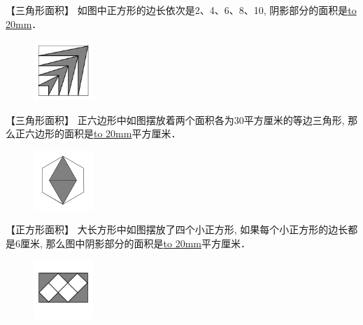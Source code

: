 \item {
    【三角形面积】
    如图中正方形的边长依次是2、4、6、8、10, 阴影部分的面积是\underline{\hbox to 20mm{}}．
    \begin{figure}[H] 
        \centering
        \includegraphics[width=0.2\textwidth]{./pics/Chapter_2/17.png}
    \end{figure}
    \vspace{1cm}
}

\item {
    【三角形面积】
    正六边形中如图摆放着两个面积各为30平方厘米的等边三角形, 那么正六边形的面积是\underline{\hbox to 20mm{}}平方厘米．
    \begin{figure}[H] 
        \centering
        \includegraphics[width=0.2\textwidth]{./pics/Chapter_2/18.png}
    \end{figure}
    \vspace{1cm}
}

\item {
    【正方形面积】
    大长方形中如图摆放了四个小正方形, 如果每个小正方形的边长都是6厘米, 那么图中阴影部分的面积是\underline{\hbox to 20mm{}}平方厘米．
    \begin{figure}[H] 
        \centering
        \includegraphics[width=0.2\textwidth]{./pics/Chapter_2/19.png}
    \end{figure}
    \vspace{1cm}
}

